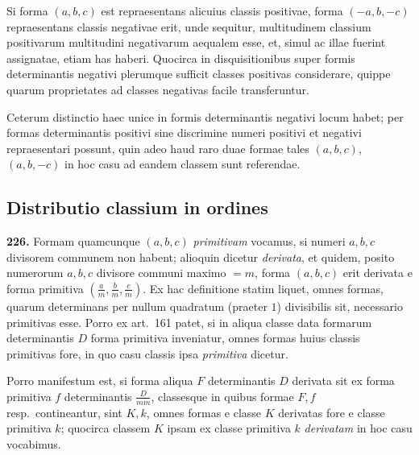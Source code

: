\documentclass[12pt,a4paper]{article}
\theoremstyle{plain}
\theoremstyle{definition}
\theoremstyle{remark}
\begin{document}
Si forma $(a,b,c)$ est repraesentans alicuius classis positivae, forma $(-a,b,-c)$ repraesentans classis negativae erit, unde sequitur, multitudinem classium positivarum multitudini negativarum aequalem esse, et, simul ac illae fuerint assignatae, etiam has haberi. Quocirca in disquisitionibus super formis determinantis negativi plerumque sufficit classes positivas considerare, quippe quarum proprietates ad classes negativas facile transferuntur.

Ceterum distinctio haec unice in formis determinantis negativi locum habet; per formas determinantis positivi sine discrimine numeri positivi et negativi repraesentari possunt, quin adeo haud raro duae formae tales $(a,b,c)$, $(a,b,-c)$ in hoc casu ad eandem classem sunt referendae.

\subsection*{Distributio classium in ordines}

\textbf{226.}
Formam quamcunque $(a,b,c)$ \emph{primitivam} vocamus, si numeri $a,b,c$ divisorem communem non habent; alioquin dicetur \emph{derivata}, et quidem, posito numerorum $a,b,c$ divisore communi maximo $=m$, forma $(a,b,c)$ erit derivata e forma primitiva $(\frac{a}{m},\frac{b}{m},\frac{c}{m})$. Ex hac definitione statim liquet, omnes formas, quarum determinans per nullum quadratum (praeter $1$) divisibilis sit, necessario primitivas esse. Porro ex art.~161 patet, si in aliqua classe data formarum determinantis $D$ forma primitiva inveniatur, omnes formas huius classis primitivas fore, in quo casu classis ipsa \emph{primitiva} dicetur.

Porro manifestum est, si forma aliqua $F$ determinantis $D$ derivata sit ex forma primitiva $f$ determinantis $\frac{D}{mm}$, classesque in quibus formae $F,f$ resp.\ contineantur, sint $K,k$, omnes formas e classe $K$ derivatas fore e classe primitiva $k$; quocirca classem $K$ ipsam ex classe primitiva $k$ \emph{derivatam} in hoc casu vocabimus.
\end{document}
